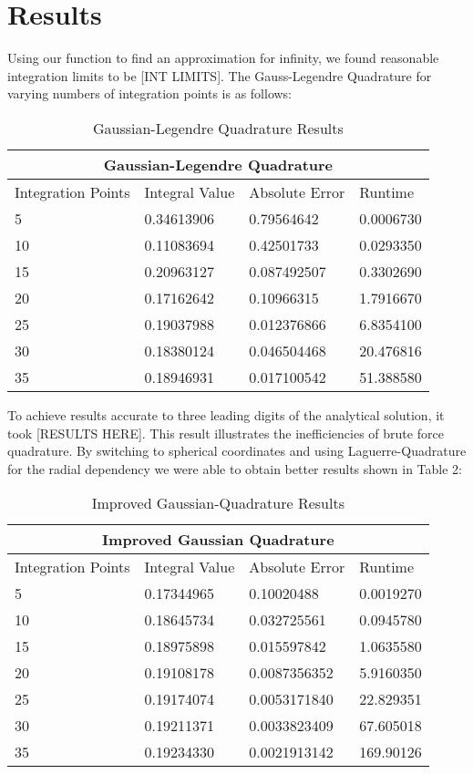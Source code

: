 \documentclass{emulateapj}
\begin{document}
\section{Results}
\label{sec:results}
Using our function to find an approximation for infinity, we found reasonable integration limits to be [INT LIMITS]. The Gauss-Legendre Quadrature for varying numbers of integration points is as follows:
\begin{table}[H]
\centering
\begin{tabular}{ |p{1.5cm}||p{1.5cm}|p{1.5cm}|p{1.5cm}|  }
 \hline
 \multicolumn{4}{|c|}{Gaussian-Legendre Quadrature} \\
 \hline
 Integration Points & Integral Value & Absolute Error & Runtime\\
 \hline
 5 & 0.34613906 & 0.79564642 & 0.0006730\\
 10 & 0.11083694 & 0.42501733 & 0.0293350\\
 15 & 0.20963127 & 0.087492507 & 0.3302690 \\
 20 & 0.17162642 & 0.10966315 & 1.7916670 \\
 25 & 0.19037988 & 0.012376866 & 6.8354100\\
 30 & 0.18380124 & 0.046504468 & 20.476816\\
 35 & 0.18946931 & 0.017100542 & 51.388580\\
 \hline
\end{tabular}
\caption{Gaussian-Legendre Quadrature Results}
\label{table:1}
\end{table}
To achieve results accurate to three leading digits of the analytical solution, it took [RESULTS HERE]. This result illustrates the inefficiencies of brute force quadrature. By switching to spherical coordinates and using Laguerre-Quadrature for the radial dependency we were able to obtain better results shown in Table 2:
\begin{table}[H]
\begin{tabular}{ |p{2cm}||p{2cm}|p{2cm}|p{2cm}|  }
 \hline
 \multicolumn{4}{|c|}{Improved Gaussian Quadrature} \\
 \hline
 Integration Points & Integral Value & Absolute Error & Runtime\\
 \hline
 5 & 0.17344965 & 0.10020488 & 0.0019270\\
 10 & 0.18645734 & 0.032725561 & 0.0945780\\
 15 & 0.18975898 & 0.015597842 & 1.0635580\\
 20 & 0.19108178 & 0.0087356352 & 5.9160350\\
 25 & 0.19174074 & 0.0053171840 & 22.829351\\
 30 & 0.19211371 & 0.0033823409 & 67.605018\\
 35 & 0.19234330 & 0.0021913142 & 169.90126\\
 \hline
\end{tabular}
\caption{Improved Gaussian-Quadrature Results}
\label{table:2}
\end{table}
\end{document}
